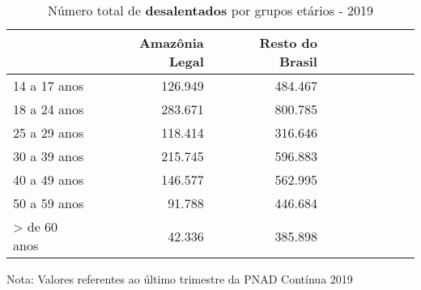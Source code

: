 \begin{table}[H]
\centering
\label{\_retrato\_emprego\_fotografia\_faixa\_etaria\_table\_desalentados}
\begin{threeparttable}
\caption{Número total de \textbf{desalentados} por grupos etários - 2019}
\begin{tabular}{l*{3}{rrr}}
\midrule \midrule
                    &Amazônia Legal&Resto do Brasil\\
\midrule
14 a 17 anos        &     126.949&     484.467\\
18 a 24 anos        &     283.671&     800.785\\
25 a 29 anos        &     118.414&     316.646\\
30 a 39 anos        &     215.745&     596.883\\
40 a 49 anos        &     146.577&     562.995\\
50 a 59 anos        &      91.788&     446.684\\
> de 60 anos        &      42.336&     385.898\\
\bottomrule
\end{tabular}
\begin{tablenotes}
\scriptsize{Nota: Valores referentes ao último trimestre da PNAD Contínua 2019}
\end{tablenotes}
\end{threeparttable}
\end{table}
